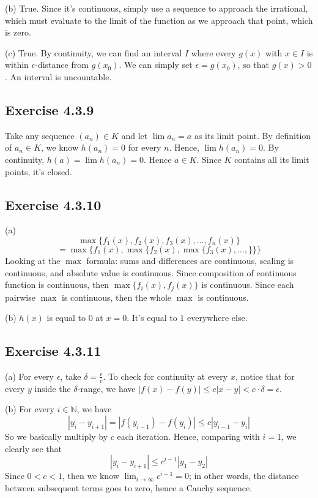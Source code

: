 \documentclass{book}
\begin{document}
\noindent
(b)
True. Since it's continuous, simply use a sequence to approach the irrational, which must evaluate to the limit of the function as we approach that point, which is zero.

\noindent
(c)
True. By continuity, we can find an interval $I$ where every $g(x)$ with $x \in I$ is within $\epsilon$-distance from $g(x_0)$. We can simply set $\epsilon = g(x_0)$, so that $g(x) > 0$. An interval is uncountable.

\subsection*{Exercise 4.3.9}
Take any sequence $(a_n) \in K$ and let $\lim a_n = a$ as its limit point. By definition of $a_n \in K$, we know $h(a_n) = 0$ for every $n$. Hence, $\lim h(a_n) = 0$. By continuity, $h(a) = \lim h(a_n) = 0$. Hence $a \in K$. Since $K$ contains all its limit points, it's closed.

\subsection*{Exercise 4.3.10}
(a)
$$\max \{ f_1(x), f_2(x), f_3(x), \ldots, f_n(x) \}$$
$$= \max \{ f_1(x), \max \{ f_2(x), \max \{ f_3(x), \ldots, \} \} \}$$
Looking at the $\max$ formula: sums and differences are continuous, scaling is continuous, and absolute value is continuous. Since composition of continuous function is continuous, then $\max \{ f_i(x), f_j(x) \}$ is continuous. Since each pairwise $\max$ is continuous, then the whole $\max$ is continuous.

\noindent
(b)
$h(x)$ is equal to $0$ at $x = 0$. It's equal to $1$ everywhere else.

\subsection*{Exercise 4.3.11}
(a)
For every $\epsilon$, take $\delta = \frac{\epsilon}{c}$. To check for continuity at every $x$, notice that for every $y$ inside the $\delta$-range, we have $|f(x) - f(y)| \leq c |x - y| < c \cdot \delta = \epsilon$.

\noindent
(b)
For every $i \in \mathbb{N}$, we have
$$|y_i - y_{i + 1}| = |f(y_{i - 1}) - f(y_i)| \leq c |y_{i - 1} - y_i|$$
So we basically multiply by $c$ each iteration. Hence, comparing with $i = 1$, we clearly see that
$$|y_i - y_{i + 1}| \leq c^{i - 1} |y_1 - y_2|$$
Since $0 < c < 1$, then we know $\lim_{i \rightarrow \infty} c^{i - 1} = 0$; in other words, the distance between subsequent terms goes to zero, hence a Cauchy sequence.
\end{document}
